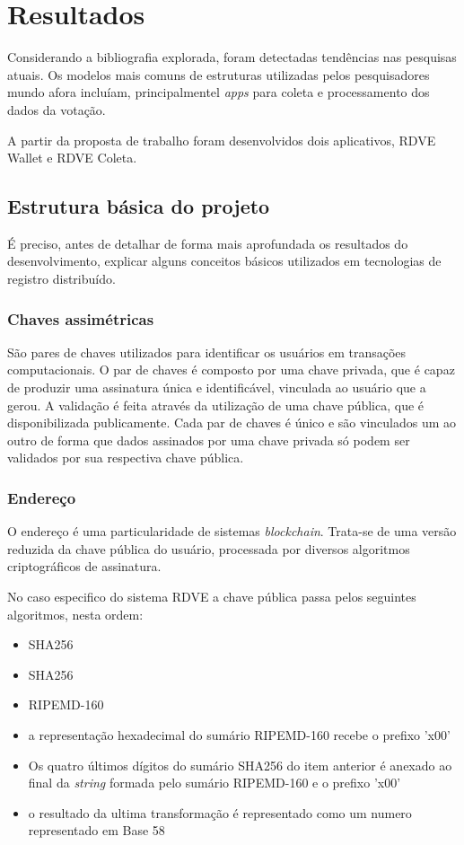 \chapter{Resultados}

Considerando a bibliografia explorada, foram detectadas tendências nas pesquisas atuais. Os modelos mais comuns de estruturas utilizadas pelos pesquisadores mundo afora incluíam, principalmentel \textit{apps} para coleta e processamento dos dados da votação. 

A partir da proposta de trabalho foram desenvolvidos dois aplicativos, RDVE Wallet e RDVE Coleta. 

\section{Estrutura básica do projeto}
É preciso, antes de detalhar de forma mais aprofundada os resultados do desenvolvimento, explicar alguns conceitos básicos utilizados em tecnologias de registro distribuído. 

\subsection{Chaves assimétricas}

São pares de chaves utilizados para identificar os usuários em transações computacionais. O par de chaves é composto por uma chave privada, que é capaz de produzir uma assinatura única e identificável, vinculada ao usuário que a gerou. A validação é feita através da utilização de uma chave pública, que é disponibilizada publicamente. Cada par de chaves é único e são vinculados um ao outro de forma que dados assinados por uma chave privada só podem ser validados por sua respectiva chave pública. 

\subsection{Endereço}

O endereço é uma particularidade de sistemas \textit{blockchain}. Trata-se de uma versão reduzida da chave pública do usuário, processada por diversos algoritmos criptográficos de assinatura.

No caso especifico do sistema RDVE a chave pública passa pelos seguintes algoritmos, nesta ordem:

\begin{itemize}
	\item SHA256
	\item SHA256
	\item RIPEMD-160
	\item a representação hexadecimal do sumário RIPEMD-160 recebe o prefixo 'x00'
	\item Os quatro últimos dígitos do sumário SHA256 do item anterior é anexado ao final da \textit{string} formada pelo sumário RIPEMD-160 e o prefixo 'x00'
	\item o resultado da ultima transformação é representado como um numero representado em Base 58 \cite{Nakamoto2019}	
\end{itemize}

